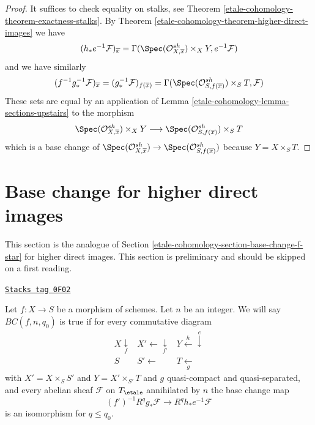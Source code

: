 \begin{proof}
It suffices to check equality on stalks, see
Theorem \ref{etale-cohomology-theorem-exactness-stalks}.
By Theorem \ref{etale-cohomology-theorem-higher-direct-images} we have
$$
(h_*e^{-1}\mathcal{F})_{\overline{x}} =
\Gamma(\Spec(\mathcal{O}_{X, \overline{x}}^{sh}) \times_X Y, e^{-1}\mathcal{F})
$$
and we have similarly
$$
(f^{-1}g_*^{-1}\mathcal{F})_{\overline{x}} =
(g_*^{-1}\mathcal{F})_{f(\overline{x})} =
\Gamma(\Spec(\mathcal{O}_{S, f(\overline{x})}^{sh}) \times_S T, \mathcal{F})
$$
These sets are equal by an application of Lemma \ref{etale-cohomology-lemma-sections-upstairs}
to the morphism
$$
\Spec(\mathcal{O}_{X, \overline{x}}^{sh}) \times_X Y
\longrightarrow
\Spec(\mathcal{O}_{S, f(\overline{x})}^{sh}) \times_S T
$$
which is a base change of
$\Spec(\mathcal{O}_{X, \overline{x}}^{sh}) \to
\Spec(\mathcal{O}_{S, f(\overline{x})}^{sh})$
because $Y = X \times_S T$.
\end{proof}

\section{Base change for higher direct images}
\label{etale-cohomology-section-base-change}
This section is the analogue of Section \ref{etale-cohomology-section-base-change-f-star}
for higher direct images.
This section is preliminary and should be skipped on a first reading.

\begin{remark}
\label{etale-cohomology-remark-base-change-holds}
\href{https://stacks.math.columbia.edu/tag/0F02}{\texttt{Stacks tag 0F02}}

Let $f : X \to S$ be a morphism of schemes. Let $n$ be an integer.
We will say $BC(f, n, q_0)$ is true if for every commutative diagram
$$
\begin{array}{ccc}X \underset{f}{\downarrow} & X' \longleftarrow\underset{f'}{\downarrow} & Y \overset{h}{\longleftarrow}\overset{e}{\downarrow} \\ S & S' \longleftarrow & T \underset{g}{\longleftarrow}\end{array}
$$
with $X' = X \times_S S'$ and $Y = X' \times_{S'} T$ and
$g$ quasi-compact and quasi-separated, and every abelian sheaf
$\mathcal{F}$ on $T_\etale$ annihilated by $n$ the base change map
$$
(f')^{-1}R^qg_*\mathcal{F}
\longrightarrow
R^qh_*e^{-1}\mathcal{F}
$$
is an isomorphism for $q \leq q_0$.
\end{remark}

